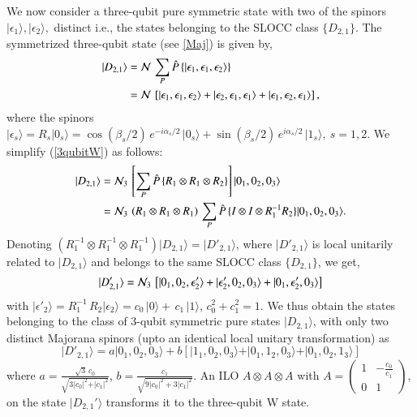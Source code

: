 {We now consider a three-qubit pure symmetric state with two of the spinors $\vert \epsilon_1\rangle,\vert \epsilon_2\rangle,$ distinct i.e., the states belonging to the SLOCC class $\{D_{2,1}\}.$  The symmetrized three-qubit state (see \eqref{Maj}) is given by,   
\begin{align}
\vert D_{2,1}\rangle&={\cal N}\, \sum_{P}\hat{P}\left\{\vert \epsilon_1, \epsilon_1, \epsilon_2\rangle\right\}\nonumber \\
&={\cal N}\,\left[ \vert \epsilon_1, \epsilon_1, \epsilon_2\rangle +\vert \epsilon_2, \epsilon_1, \epsilon_1\rangle + \vert \epsilon_1, \epsilon_2, \epsilon_1\rangle \right],\label{3qubitW}
\end{align}
where the spinors $\vert\epsilon_s\rangle= R_s\vert 0_s\rangle=\cos(\beta_s/2)\, e^{-i\alpha_s/2}\, \vert 0_s\rangle +\sin(\beta_s/2)\, e^{i\alpha_s/2}\, \vert 1_s\rangle,\ s=1,2$. We simplify (\ref{3qubitW}) as follows: 
\begin{align}
\vert D_{2,1}\rangle &= {\cal N}_3\,\left[\sum_P {\hat P}\,\{R_1\otimes R_1\otimes R_2\}\right] \vert 0_1,0_2,0_3\rangle \nonumber\\ 
&= {\cal N}_3\, \left(R_1\otimes R_1\otimes R_1\right)\, \sum_P {\hat P}\, \{I\otimes I\otimes R_{1}^{-1}R_2 \} \vert 0_1,0_2,0_3\rangle.\label{3W2}
\end{align}
Denoting $\left(R^{-1}_1\otimes R^{-1}_1\otimes R^{-1}_1\right) \vert D_{2,1}\rangle=\vert D'_{2,1}\rangle$, where $\vert D'_{2,1}\rangle$  is local unitarily related to  $\vert D_{2,1}\rangle$ and belongs to the same SLOCC class $\{D_{2,1}\}$, we get, 
\begin{equation}
\vert D'_{2,1}\rangle={\cal N}_3\,\left[ \vert 0_1,0_2,\epsilon'_2\rangle  +\vert \epsilon'_2, 0_2, 0_3\rangle + \vert 0_1,  \epsilon'_2, 0_3\rangle \right]     
\end{equation}
with $\vert\epsilon'_2\rangle=R_1^{-1}\,R_2\vert \epsilon_2\rangle=c_0\,\vert 0\rangle +\, c_1\,\vert 1\rangle$, $c_0^2+c_1^2=1.$ We thus obtain the states belonging to the class of 3-qubit symmetric pure states  $\vert D_{2,1}\rangle$, with only two distinct Majorana spinors (upto an identical local unitary transformation) as
\begin{equation}
\vert D'_{2,1}\rangle=a\vert 0_1,0_2,0_3\rangle+b[\vert 1_1,0_2,0_3\rangle +\vert 0_1,1_2,0_3\rangle+\vert 0_1,0_2,1_3\rangle]\label{Wfin}
\end{equation}
where $a=\frac{\sqrt{3}\, c_0}{\sqrt{3\vert c_0\vert^2+\vert c_1\vert^2}}$, $b=\frac{ c_1}{\sqrt{9\vert c_0\vert^2+3\vert c_1\vert^2}}$. An ILO $A\otimes A\otimes A$  with  $A=\left(\begin{array}{cc} 1 & -\frac{c_0}{c_1} \\ 0 & 1 \end{array}\right)$, on the state $\vert D_{2,1}'\rangle$ transforms it to the three-qubit W state.
 
}
